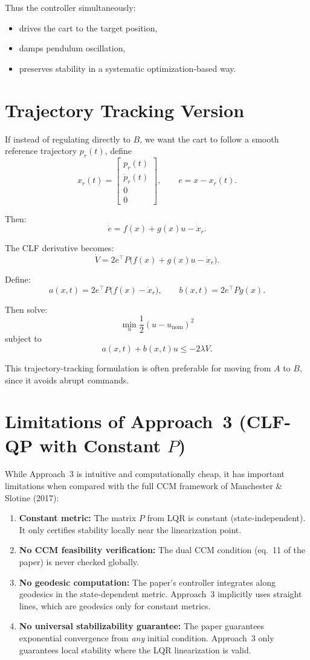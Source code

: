 \documentclass[11pt,a4paper]{article}
\begin{document}
Thus the controller simultaneously:
\begin{itemize}[leftmargin=2em]
    \item drives the cart to the target position,
    \item damps pendulum oscillation,
    \item preserves stability in a systematic optimization-based way.
\end{itemize}

\section{Trajectory Tracking Version}

If instead of regulating directly to \(B\), we want the cart to follow a smooth reference trajectory \(p_r(t)\), define
\[
x_r(t)=
\begin{bmatrix}
p_r(t) \\ \dot p_r(t) \\ 0 \\ 0
\end{bmatrix},
\qquad
e = x - x_r(t).
\]

Then:
\[
\dot e = f(x)+g(x)u - \dot x_r.
\]

The CLF derivative becomes:
\[
\dot V = 2e^\top P\bigl(f(x)+g(x)u-\dot x_r\bigr).
\]

Define:
\[
a(x,t)=2e^\top P\bigl(f(x)-\dot x_r\bigr),
\qquad
b(x,t)=2e^\top P g(x).
\]

Then solve:
\[
\min_u \frac{1}{2}(u-u_{\mathrm{nom}})^2
\]
subject to
\[
a(x,t)+b(x,t)u \le -2\lambda V.
\]

This trajectory-tracking formulation is often preferable for moving from \(A\) to \(B\), since it avoids abrupt commands.

\section{Limitations of Approach~3 (CLF-QP with Constant \(P\))}

While Approach~3 is intuitive and computationally cheap, it has important limitations when compared with the full CCM framework of Manchester \& Slotine (2017):

\begin{enumerate}[leftmargin=2em]
    \item \textbf{Constant metric:} The matrix \(P\) from LQR is constant (state-independent). It only certifies stability locally near the linearization point.
    \item \textbf{No CCM feasibility verification:} The dual CCM condition (eq.~11 of the paper) is never checked globally.
    \item \textbf{No geodesic computation:} The paper's controller integrates along geodesics in the state-dependent metric. Approach~3 implicitly uses straight lines, which are geodesics only for constant metrics.
    \item \textbf{No universal stabilizability guarantee:} The paper guarantees exponential convergence from \emph{any} initial condition. Approach~3 only guarantees local stability where the LQR linearization is valid.
\end{enumerate}
\end{document}

